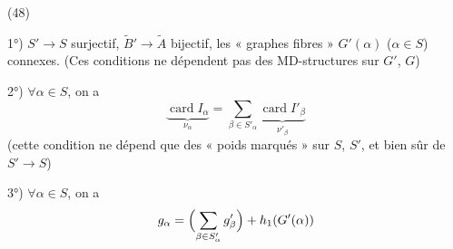\documentclass[11pt,a4paper]{article}
\begin{document}
(48)

1°) $S' \to S$ surjectif, $\tilde{B}' \to \tilde{A}$ bijectif, les « graphes fibres » $G'(\alpha)$ ($\alpha \in S$) connexes. (Ces conditions ne dépendent pas des MD-structures sur $G'$, $G$)

2°) $\forall \alpha \in S$, on a
\[
\underbrace{\operatorname{card} I_\alpha}_{\nu_\alpha} = \sum_{\beta\in S'_\alpha} \underbrace{\operatorname{card} I'_\beta}_{\nu'_\beta}
\]
(cette condition ne dépend que des « poids marqués » sur $S$, $S'$, et bien sûr de $S' \to S$)

3°) $\forall \alpha \in S$, on a
\[
g_\alpha = \Bigl(\sum_{\beta\in S'_\alpha} g'_\beta\Bigr) + h_1(G'(\alpha))
\]

\end{document}
